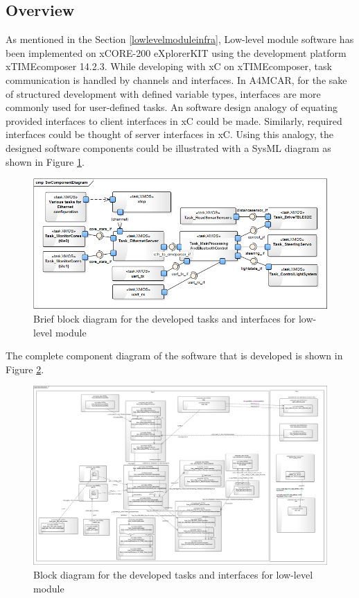 \subsection{Overview} \label{lloverviewsection}
As mentioned in the Section \ref{lowlevelmoduleinfra}, Low-level module software has been implemented on xCORE-200 eXplorerKIT using the development platform xTIMEcomposer 14.2.3. While developing with xC on xTIMEcomposer, task communication is handled by channels and interfaces. In A4MCAR, for the sake of structured development with defined variable types, interfaces are more commonly used for user-defined tasks. An software design analogy of equating provided interfaces to client interfaces in xC could be made. Similarly, required interfaces could be thought of server interfaces in xC. Using this analogy, the designed software components could be illustrated with a SysML \cite{sysml} diagram as shown in Figure \ref{fig:sysmlxmostasksbrief}.
\begin{figure}[!ht]
	\centering
	\captionsetup{justification=centering}
	\includegraphics[width=\textwidth]{content/images/sysmlxmostasksbrief.png}
	\caption{Brief block diagram for the developed tasks and interfaces for low-level module}
	\label{fig:sysmlxmostasksbrief}
\end{figure}

The complete component diagram of the software that is developed is shown in Figure \ref{fig:sysmlxmostasks}.

\begin{figure}[!ht]
	\centering
	\captionsetup{justification=centering}
	\includegraphics[scale=0.21]{content/images/sysmlxmostasks.png}
	\caption{Block diagram for the developed tasks and interfaces for low-level module}
	\label{fig:sysmlxmostasks}
\end{figure}

